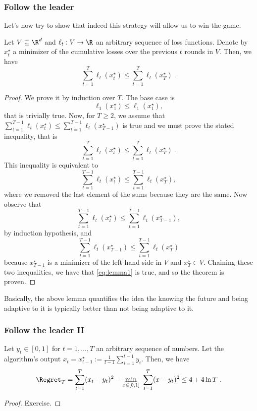 \documentclass{beamer}
\begin{document}
\begin{frame}
  \frametitle{Follow the leader}
  Let's now try to show that indeed this strategy will allow us to win the game.
  \begin{lemma}
    \label{lemma:be_leader}
    Let $V \subseteq \R^d$ and $\ell_t :V \rightarrow \R$ an arbitrary sequence of loss functions.
    Denote by $x^\star_t$ a minimizer of the cumulative losses over the previous $t$ rounds in $V$. Then, we have
    \[
      \sum_{t=1}^T \ell_t(x^\star_{t}) \leq \sum_{t=1}^T \ell_t(x^\star_{T})~.
    \]
  \end{lemma}
  \begin{proof}
    We prove it by induction over $T$. The base case is
    \[
      \ell_1(x^\star_1) \leq \ell_1(x^\star_{1}),
    \]
    that is trivially true.
    Now, for $T\geq2$, we assume that $\sum_{t=1}^{T-1} \ell_t(x^\star_{t}) \leq \sum_{t=1}^{T-1} \ell_t(x^\star_{T-1})$ is true and we must prove the stated inequality, that is
    \[
      \sum_{t=1}^T \ell_t(x^\star_{t}) \leq \sum_{t=1}^T \ell_t(x^\star_{T})~.
    \]
    This inequality is equivalent to
    \begin{equation}
      \label{eq:lemma1}
      \sum_{t=1}^{T-1} \ell_t(x^\star_{t}) \leq \sum_{t=1}^{T-1} \ell_t(x^\star_{T}),
    \end{equation}
    where we removed the last element of the sums because they are the same.
    Now observe that
    \[
      \sum_{t=1}^{T-1} \ell_t(x^\star_{t}) \leq \sum_{t=1}^{T-1} \ell_t(x^\star_{T-1}),
    \]
    by induction hypothesis, and
    \[
      \sum_{t=1}^{T-1} \ell_t(x^\star_{T-1}) \leq \sum_{t=1}^{T-1} \ell_t(x^\star_{T})
    \]
    because $x^\star_{T-1}$ is a minimizer of the left hand side in $V$ and $x^\star_{T} \in V$.
    Chaining these two inequalities, we have that \eqref{eq:lemma1} is true, and so the theorem is proven.
  \end{proof}
  Basically, the above lemma quantifies the idea the knowing the future and being adaptive to it is typically better than not being adaptive to it.

\end{frame}

\begin{frame}
  \frametitle{Follow the leader II}
  \begin{theorem}
    Let $y_t \in [0,1]$ for $t=1,\dots,T$ an arbitrary sequence of numbers. Let the algorithm's output $x_t=x_{t-1}^\star:=\frac{1}{t-1}\sum_{i=1}^{t-1} y_i$. Then, we have
    \[
      \Regret_T = \sum_{t=1}^T (x_t - y_t)^2 - \min_{x \in [0,1]} \ \sum_{t=1}^T (x - y_t)^2 \leq 4 + 4\ln T~.
    \]
  \end{theorem}
  \begin{proof}
    Exercise.
  \end{proof}

\end{frame}
\end{document}
